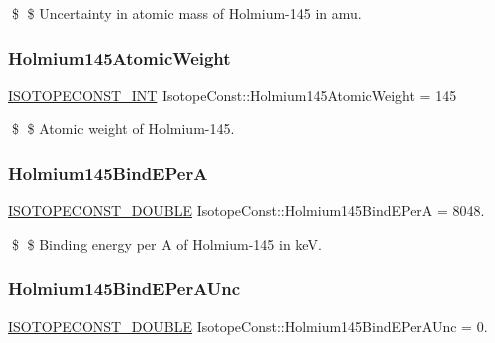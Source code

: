 \$ \$ Uncertainty in atomic mass of Holmium-\/145 in amu. \mbox{\label{group___isotope_const-_holmium-_ho145_gabc1a2b2cc215fff3c84936d17f55c670}} 
\subsubsection{\texorpdfstring{Holmium145\+Atomic\+Weight}{Holmium145AtomicWeight}}
{\footnotesize\ttfamily \mbox{\hyperlink{group___isotope_const-_macros_ga5f18360b3e99483a35c32d789e62621c}{I\+S\+O\+T\+O\+P\+E\+C\+O\+N\+S\+T\+\_\+\+I\+NT}} Isotope\+Const\+::\+Holmium145\+Atomic\+Weight = 145}

\$ \$ Atomic weight of Holmium-\/145. \mbox{\label{group___isotope_const-_holmium-_ho145_gafcea964acbd088085fbaf5d2bbac22d5}} 
\subsubsection{\texorpdfstring{Holmium145\+Bind\+E\+PerA}{Holmium145BindEPerA}}
{\footnotesize\ttfamily \mbox{\hyperlink{group___isotope_const-_macros_ga8f45a7272ce02c0b4c65c44636ed719a}{I\+S\+O\+T\+O\+P\+E\+C\+O\+N\+S\+T\+\_\+\+D\+O\+U\+B\+LE}} Isotope\+Const\+::\+Holmium145\+Bind\+E\+PerA = 8048.}

\$ \$ Binding energy per A of Holmium-\/145 in keV. \mbox{\label{group___isotope_const-_holmium-_ho145_ga89c352fce75d3195f56aa4d568b5cb88}} 
\subsubsection{\texorpdfstring{Holmium145\+Bind\+E\+Per\+A\+Unc}{Holmium145BindEPerAUnc}}
{\footnotesize\ttfamily \mbox{\hyperlink{group___isotope_const-_macros_ga8f45a7272ce02c0b4c65c44636ed719a}{I\+S\+O\+T\+O\+P\+E\+C\+O\+N\+S\+T\+\_\+\+D\+O\+U\+B\+LE}} Isotope\+Const\+::\+Holmium145\+Bind\+E\+Per\+A\+Unc = 0.}

